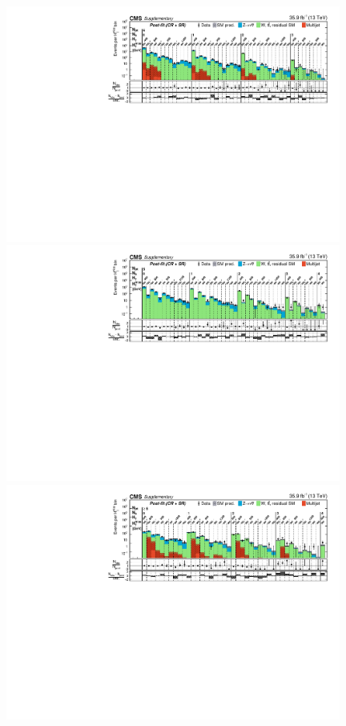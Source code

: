 \begin{figure}
    \begin{center}
            \includegraphics[width=0.98\textwidth]{Supplementary/CMS-SUS-16-038_Figure-aux_014-a}
            \includegraphics[width=0.98\textwidth]{Supplementary/CMS-SUS-16-038_Figure-aux_014-b}\\
            \includegraphics[width=0.98\textwidth]{Supplementary/CMS-SUS-16-038_Figure-aux_014-c}\\

\end{center}
\end{figure}
